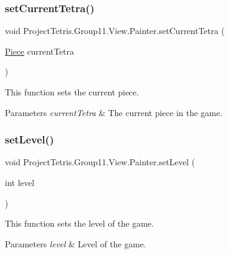 \subsubsection{\texorpdfstring{set\+Current\+Tetra()}{setCurrentTetra()}}
{\footnotesize\ttfamily void Project\+Tetris.\+Group11.\+View.\+Painter.\+set\+Current\+Tetra (\begin{DoxyParamCaption}\item[{\hyperlink{class_project_tetris_1_1_group11_1_1_model_1_1_piece}{Piece}}]{current\+Tetra }\end{DoxyParamCaption})}



This function sets the current piece. 


\begin{DoxyParams}{Parameters}
{\em current\+Tetra} & The current piece in the game. \\
\hline
\end{DoxyParams}
\hypertarget{class_project_tetris_1_1_group11_1_1_view_1_1_painter_a5df3fdff19e1680167dda4e72f305b93}{}\label{class_project_tetris_1_1_group11_1_1_view_1_1_painter_a5df3fdff19e1680167dda4e72f305b93} 
\subsubsection{\texorpdfstring{set\+Level()}{setLevel()}}
{\footnotesize\ttfamily void Project\+Tetris.\+Group11.\+View.\+Painter.\+set\+Level (\begin{DoxyParamCaption}\item[{int}]{level }\end{DoxyParamCaption})}



This function sets the level of the game. 


\begin{DoxyParams}{Parameters}
{\em level} & Level of the game. \\
\hline
\end{DoxyParams}
\hypertarget{class_project_tetris_1_1_group11_1_1_view_1_1_painter_a7094e1d692231ec3e6a3d4d0db2d2860}{}\label{class_project_tetris_1_1_group11_1_1_view_1_1_painter_a7094e1d692231ec3e6a3d4d0db2d2860} 
